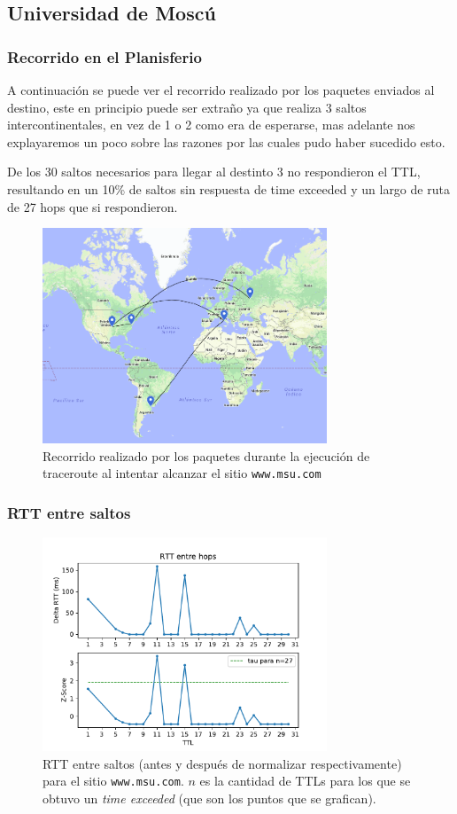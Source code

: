 \subsection*{Universidad de Moscú}

\subsubsection*{Recorrido en el Planisferio}

A continuación se puede ver el recorrido realizado por los paquetes enviados al destino, este en principio puede ser extraño ya que realiza 3 saltos intercontinentales, en vez de 1 o 2 como era de esperarse, mas adelante nos explayaremos un poco sobre las razones por las cuales pudo haber sucedido esto.

De los 30 saltos necesarios para llegar al destinto 3 no respondieron el TTL, resultando en un 10\% de saltos sin respuesta de time exceeded y un largo de ruta de 27 hops que si respondieron.

\begin{figure}[H]
  \centering
  \includegraphics[width=8.5cm]{figs/moscow.png}
  \caption{\footnotesize Recorrido realizado por los paquetes durante la ejecución de traceroute al intentar alcanzar el sitio \texttt{www.msu.com}}
\end{figure}

\subsubsection*{RTT entre saltos}

\begin{figure}[H]
  \centering
  \includegraphics[width=8.5cm]{figs/traceroute-moscow.pdf}
  \caption{\footnotesize RTT entre saltos (antes y después de normalizar respectivamente) para el sitio \texttt{www.msu.com}. $n$ es la cantidad de TTLs para los que se obtuvo un \emph{time exceeded} (que son los puntos que se grafican).}
  \label{plot-moscow}
\end{figure}

